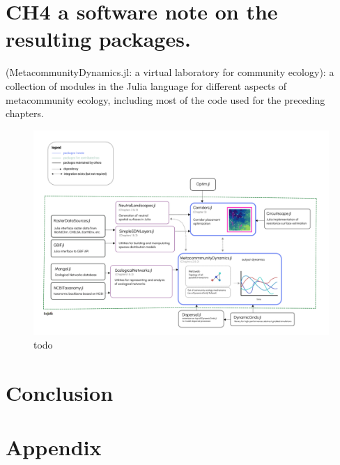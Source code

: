 \documentclass[11pt]{article}
\makeatletter
\def\maxwidth{\ifdim\Gin@nat@width>\linewidth\linewidth
\else\Gin@nat@width\fi}
\let\Oldincludegraphics\includegraphics
\renewcommand{\includegraphics}[1]{\Oldincludegraphics[width=\maxwidth]{#1}}
\makeatother
\begin{document}
\hypertarget{ch4-a-software-note-on-the-resulting-packages.}{%
\section{CH4 a software note on the resulting
packages.}\label{ch4-a-software-note-on-the-resulting-packages.}}

(MetacommunityDynamics.jl: a virtual laboratory for community ecology):
a collection of modules in the Julia language for different aspects of
metacommunity ecology, including most of the code used for the preceding
chapters.

\begin{figure}
\centering
\includegraphics{./figures/software.png}
\caption{todo}
\end{figure}

\hypertarget{conclusion}{%
\section{Conclusion}\label{conclusion}}

\hypertarget{appendix}{%
\section{Appendix}\label{appendix}}
\end{document}

